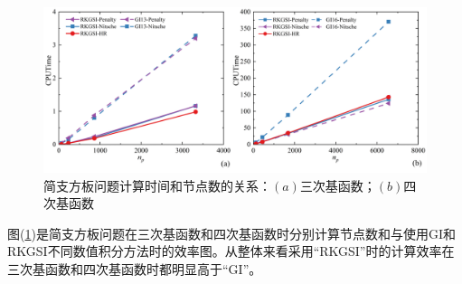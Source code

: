\begin{figure}[!h]
    \centering
    \includegraphics[scale=0.6]{figure/P/R/cputime.png}
    \caption{简支方板问题计算时间和节点数的关系：$(a)$三次基函数；$(b)$四次基函数}\label{Rcputime}
\end{figure}\newpage
图(\ref{Rcputime})是简支方板问题在三次基函数和四次基函数时分别计算节点数和与使用GI和RKGSI不同数值积分方法时的效率图。从整体来看采用“RKGSI”时的计算效率在三次基函数和四次基函数时都明显高于“GI”。\par
